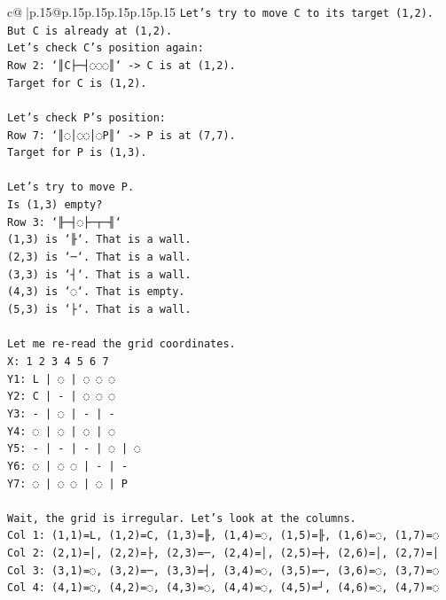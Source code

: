 \documentclass{article}
\begin{document}
{\begin{supertabular}{c@{$\;$}|p{.15\linewidth}@{}p{.15\linewidth}p{.15\linewidth}p{.15\linewidth}p{.15\linewidth}p{.15\linewidth}}
{{{\texttt{Let's try to move C to its target (1,2). But C is already at (1,2).} \\
\texttt{Let's check C's position again:} \\
\texttt{Row 2: `║C├─┤◌◌◌║` {-}> C is at (1,2).} \\
\texttt{Target for C is (1,2).} \\
\\ 
\texttt{Let's check P's position:} \\
\texttt{Row 7: `║◌│◌◌│◌P║` {-}> P is at (7,7).} \\
\texttt{Target for P is (1,3).} \\
\\ 
\texttt{Let's try to move P.} \\
\texttt{Is (1,3) empty?} \\
\texttt{Row 3: `╟─┤◌├─┬─╢`} \\
\texttt{(1,3) is `╟`. That is a wall.} \\
\texttt{(2,3) is `─`. That is a wall.} \\
\texttt{(3,3) is `┤`. That is a wall.} \\
\texttt{(4,3) is `◌`. That is empty.} \\
\texttt{(5,3) is `├`. That is a wall.} \\
\\ 
\texttt{Let me re{-}read the grid coordinates.} \\
\texttt{X: 1 2 3 4 5 6 7} \\
\texttt{Y1: L | ◌ | ◌ ◌ ◌} \\
\texttt{Y2: C | {-} | ◌ ◌ ◌} \\
\texttt{Y3: {-} | ◌ | {-} | {-}} \\
\texttt{Y4: ◌ | ◌ | ◌ | ◌} \\
\texttt{Y5: {-} | {-} | {-} | ◌ | ◌} \\
\texttt{Y6: ◌ | ◌ ◌ | {-} | {-}} \\
\texttt{Y7: ◌ | ◌ ◌ | ◌ | P} \\
\\ 
\texttt{Wait, the grid is irregular. Let's look at the columns.} \\
\texttt{Col 1: (1,1)=L, (1,2)=C, (1,3)=╟, (1,4)=◌, (1,5)=╟, (1,6)=◌, (1,7)=◌} \\
\texttt{Col 2: (2,1)=│, (2,2)=├, (2,3)=─, (2,4)=│, (2,5)=┼, (2,6)=│, (2,7)=│} \\
\texttt{Col 3: (3,1)=◌, (3,2)=─, (3,3)=┤, (3,4)=◌, (3,5)=─, (3,6)=◌, (3,7)=◌} \\
\texttt{Col 4: (4,1)=◌, (4,2)=◌, (4,3)=◌, (4,4)=◌, (4,5)=┘, (4,6)=◌, (4,7)=◌} \\
}}}
\end{supertabular}}
\end{document}
